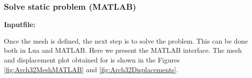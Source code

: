 \clearpage
\subsubsection*{Solve static problem (MATLAB)}
\begin{flushleft}
  \textbf{Inputfile:}
  \\
\end{flushleft}
\hspace{1in}
{\footnotesize
{}
}

\clearpage
Once the mesh is defined, the next step is to solve the problem.
This can be done both in Lua and MATLAB. Here we present the MATLAB
interface. 
The mesh and displacement plot obtained for 
is shown in the Figures \ref{fig:Arch32MeshMATLAB} and 
\ref{fig:Arch32Displacements}.

